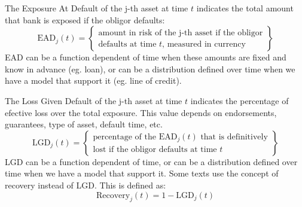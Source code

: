 \documentclass[11pt,fleqn]{book} %
\begin{document}
\begin{definition}
	The Exposure At Default of the j-th asset at time $t$ indicates 
	the total amount that bank is exposed if the obligor defaults:
	\begin{displaymath}
		\text{EAD}_j(t) = \left\{
		\begin{array}{c}
			\text{amount in risk of the j-th asset if the obligor} \\
			\text{defaults at time $t$, measured in currency}
		\end{array}
		\right\}
	\end{displaymath}
	EAD can be a function dependent of time when these amounts are
	fixed and know in advance (eg. loan), or can be a distribution
	defined over time when we have a model that support it 
	(eg. line of credit).
\end{definition}

\begin{definition}
	The Loss Given Default of the j-th asset at time $t$ indicates 
	the percentage of efective loss over the total exposure. This
	value depends on endorsements, guarantees, type of asset, 
	default time, etc.
	\begin{displaymath}
		\text{LGD}_j(t) = \left\{
		\begin{array}{c}
			\text{percentage of the $\text{EAD}_j(t)$ that is definitively} \\
			\text{lost if the obligor defaults at time $t$}
		\end{array}
		\right\}
	\end{displaymath}
	LGD can be a function dependent of time, or can be a distribution
	defined over time when we have a model that support it. 
	Some texts use the concept of recovery instead of LGD. This is 
	defined as:
	\begin{displaymath}
		\text{Recovery}_j(t) = 1- \text{LGD}_j(t)
	\end{displaymath}
\end{definition}
\end{document}
